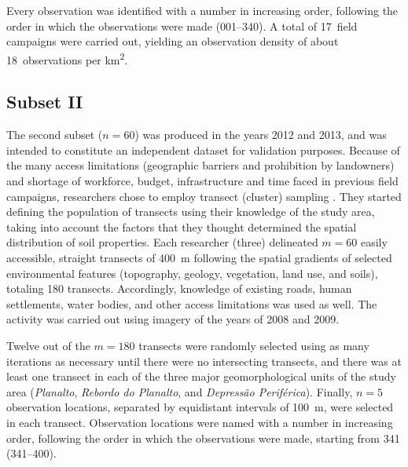 Every observation was identified with a number in increasing order, following the order in which the 
observations were made (\num{001}--\num{340}). A total of \num{17}~field campaigns were carried out, yielding 
an observation density of about \num{18}~observations per \si{\kilo\metre\squared}.

\subsection{Subset II}
\label{sec:chap04-subset-ii}

The second subset ($n = 60$) was produced in the years \num{2012} and \num{2013}, and was intended to 
constitute an independent dataset for validation purposes. Because of the many access limitations 
(geographic barriers and prohibition by landowners) and shortage of workforce, budget, infrastructure and 
time faced in previous field campaigns, researchers chose to employ transect (cluster) sampling 
\cite{MiguelEtAl2012, Moura-BuenoEtAl2012, Samuel-RosaEtAl2013}. They started defining the population of 
transects using their knowledge of the study area, taking into account the factors that they thought 
determined the spatial distribution of soil properties. Each researcher (three) delineated $m = 60$ easily 
accessible, straight transects of \SI{400}{\metre} following the spatial gradients of selected environmental 
features 
(topography, geology, vegetation, land use, and soils), totaling 180 transects. Accordingly, knowledge of 
existing roads, human 
settlements, water bodies, and other access limitations was used as well. The activity was carried out using 
\googlearth{} imagery of the years of \num{2008} and \num{2009}.


Twelve out of the $m = 180$ transects were randomly selected using as many iterations as necessary until 
there were no intersecting transects, and there was at least one transect in each of the three major 
geomorphological units of the study area (\textit{Planalto}, \textit{Rebordo do Planalto}, and 
\textit{Depressão Periférica}). 
Finally, $n = 5$ observation locations, separated by equidistant intervals of \SI{100}{\metre}, were 
selected in each transect. Observation locations were named with a number in increasing order, 
following the order in which the observations were made, starting from \num{341} (\num{341}--\num{400}).

